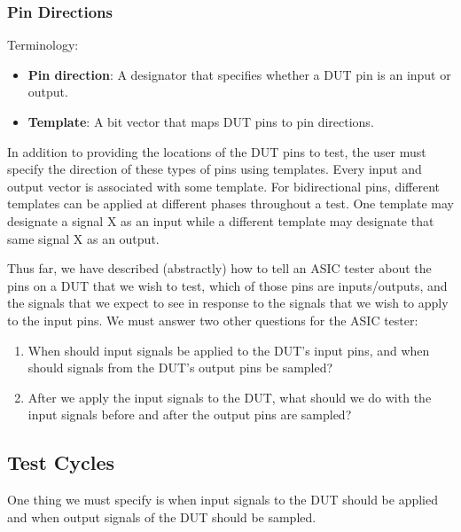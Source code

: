 \subsubsection{Pin Directions}
\begin{flushleft}
Terminology: 
\begin{itemize}
\item \textbf{Pin direction}: A designator that specifies whether a DUT pin is an input or output.
\item \textbf{Template}: A bit vector that maps DUT pins to pin directions.
\end{itemize}
\end{flushleft}

In addition to providing the locations of the DUT pins to test, the user must specify the direction of these types of pins using templates. Every input and output vector is associated with some template. For bidirectional pins, different templates can be applied at different phases throughout a test. One template may designate a signal X as an input while a different template may designate that same signal X as an output. 

Thus far, we have described (abstractly) how to tell an ASIC tester about the pins on a DUT that we wish to test, which of those pins are inputs/outputs, and the signals that we expect to see in response to the signals that we wish to apply to the input pins. We must answer two other questions for the ASIC tester: 

\begin{enumerate}
\item When should input signals be applied to the DUT's input pins, and when should signals from the DUT's output pins be sampled?
\item After we apply the input signals to the DUT, what should we do with the input signals before and after the output pins are sampled?
\end{enumerate}

\subsection{Test Cycles}
One thing we must specify is when input signals to the DUT should be applied and when output signals of the DUT should be sampled.

